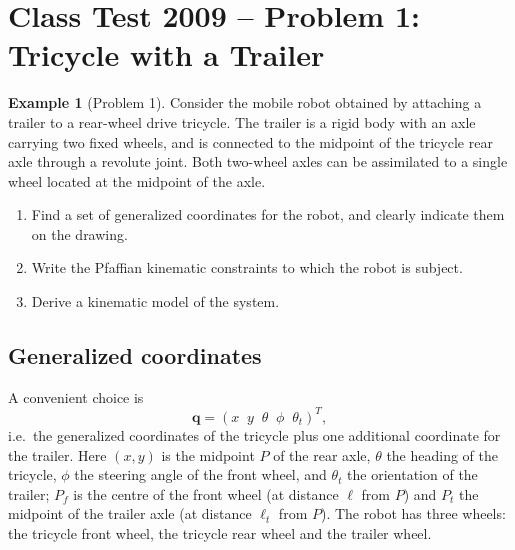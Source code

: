 \documentclass[11pt,a4paper]{article}
\theoremstyle{definition}
\newtheorem{example}[definition]{Example}
\theoremstyle{plain}
\newcommand{\qv}{\bm{q}}
\begin{document}
\section{Class Test 2009 -- Problem 1: Tricycle with a Trailer}\label{sec:test}

\begin{example}[Problem 1]
Consider the mobile robot obtained by attaching a trailer to a rear-wheel drive tricycle. The trailer is a rigid body with an axle carrying two fixed wheels, and is connected to the midpoint of the tricycle rear axle through a revolute joint. Both two-wheel axles can be assimilated to a single wheel located at the midpoint of the axle.
\begin{enumerate}[nosep]
 \item Find a set of generalized coordinates for the robot, and clearly indicate them on the drawing.
 \item Write the Pfaffian kinematic constraints to which the robot is subject.
 \item Derive a kinematic model of the system.
\end{enumerate}
\end{example}

\subsection{Generalized coordinates}

A convenient choice is
\[
 \qv=(x\;\;y\;\;\theta\;\;\phi\;\;\theta_t)^T,
\]
i.e.\ the generalized coordinates of the tricycle plus one additional coordinate for the trailer. Here $(x,y)$ is the midpoint $P$ of the rear axle, $\theta$ the heading of the tricycle, $\phi$ the steering angle of the front wheel, and $\theta_t$ the orientation of the trailer; $P_f$ is the centre of the front wheel (at distance $\ell$ from $P$) and $P_t$ the midpoint of the trailer axle (at distance $\ell_t$ from $P$). The robot has three wheels: the tricycle front wheel, the tricycle rear wheel and the trailer wheel.
\end{document}
